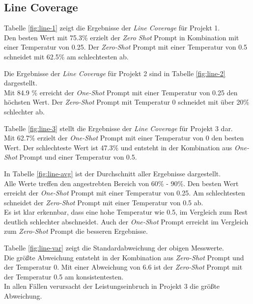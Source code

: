 \subsection{Line Coverage}
Tabelle \ref{fig:line-1} zeigt die Ergebnisse der \textit{Line Coverage} für Projekt 1. \\Den besten Wert mit 75.3\% erzielt der \textit{Zero Shot} Prompt in Kombination mit einer Temperatur von 0.25. Der \textit{Zero-Shot} Prompt mit einer Temperatur von 0.5 schneidet mit 62.5\% am schlechtesten ab.

Die Ergebnisse der \textit{Line Coverage} für Projekt 2 sind in Tabelle \ref{fig:line-2} dargestellt. \\Mit 84.9 \% erreicht der \textit{One-Shot} Prompt mit einer Temperatur von 0.25 den höchsten Wert. Der \textit{Zero-Shot} Prompt mit Temperatur 0 schneidet mit über 20\% schlechter ab.

Tabelle \ref{fig:line-3} stellt die Ergebnisse der \textit{Line Coverage} für Projekt 3 dar. \\Mit 62.7\% erzielt der \textit{One-Shot} Prompt mit einer Temperatur von 0 den besten Wert. Der schlechteste Wert ist 47.3\% und entsteht in der Kombination aus \textit{One-Shot} Prompt und einer Temperatur von 0.5.

In Tabelle \ref{fig:line-avg} ist der Durchschnitt aller Ergebnisse dargestellt.\\ Alle Werte treffen den angestrebten Bereich von 60\% - 90\%. Den besten Wert erreicht der \textit{One-Shot} Prompt mit einer Temperatur von 0.25. Am schlechtesten schneidet der \textit{Zero-Shot} Prompt mit einer Temperatur von 0.5 ab. \\Es ist klar erkennbar, dass eine hohe Temperatur wie 0.5, im Vergleich zum Rest deutlich schlechter abschneidet. Auch der \textit{One-Shot} Prompt erreicht im Vergleich zum \textit{Zero-Shot} Prompt die besseren Ergebnisse. 

Tabelle \ref{fig:line-var} zeigt die Standardabweichung der obigen Messwerte.\\ Die größte Abweichung entsteht in der Kombination aus \textit{Zero-Shot} Prompt und der Temperatur 0. Mit einer Abweichung von 6.6 ist der \textit{Zero-Shot} Prompt mit der Temperatur 0.5 am konsistentesten.\\ In allen Fällen verursacht der Leistungseinbruch in Projekt 3 die größte Abweichung.


